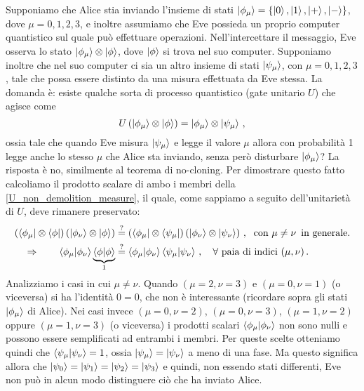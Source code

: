 \noindent Supponiamo che Alice stia inviando l'insieme di stati $\ket{\phi_\mu} = \{ \ket{0}, \ket{1}, \ket{+}, \ket{-} \}$, dove $\mu = 0, 1,2,3$, e inoltre assumiamo che Eve possieda un proprio computer quantistico sul quale può effettuare operazioni. Nell'intercettare il messaggio, Eve osserva lo stato $\ket{\phi_\mu} \otimes \ket{\phi}$, dove $\ket{\phi}$ si trova nel suo computer. Supponiamo inoltre che nel suo computer ci sia un altro insieme di stati $\ket{\psi_\mu}$, con $\mu = 0,1,2,3$, tale che possa essere distinto da una misura effettuata da Eve stessa. La domanda è: esiste qualche sorta di processo quantistico (gate unitario $U$) che agisce come
\begin{equation}\label{U_non_demolition_measure}
    U \left( \ket{\phi_\mu} \otimes \ket{\phi} \right) = \ket{\phi_\mu} \otimes \ket{\psi_\mu} \, ,
\end{equation}
ossia tale che quando Eve misura $\ket{\psi_\mu}$ e legge il valore $\mu$ allora con probabilità 1 legge anche lo stesso $\mu$ che Alice sta inviando, senza però disturbare $\ket{\phi_\mu}$? La risposta è no, similmente al teorema di no-cloning. Per dimostrare questo fatto calcoliamo il prodotto scalare di ambo i membri della \eqref{U_non_demolition_measure}, il quale, come sappiamo a seguito dell'unitarietà di $U$, deve rimanere preservato:
\begin{align*}
    \left( \bra{\phi_\mu} \otimes \bra{\phi} \right) \left( \ket{\phi_\nu} \otimes \ket{\phi} \right) &\overset{?}{=} \left( \bra{\phi_\mu} \otimes \bra{\psi_\mu} \right) \left( \ket{\phi_\nu} \otimes \ket{\psi_\nu} \right) \, , \; \text{ con } \mu \neq \nu \, \text{ in generale.} \\
    \Rightarrow \qquad \braket{\phi_\mu}{\phi_\nu} \underbrace{\braket{\phi}}_1 &\overset{?}{=} \braket{\phi_\mu}{\phi_\nu} \braket{\psi_\mu}{\psi_\nu} \, , \quad \forall \text{ paia di indici } (\mu,\nu) \, .
\end{align*}
Analizziamo i casi in cui $\mu \neq \nu$. Quando $(\mu = 2, \nu = 3)$ e $(\mu = 0, \nu = 1)$ (o viceversa) si ha l'identità $0 = 0$, che non è interessante (ricordare sopra gli stati $\ket{\phi_\mu}$ di Alice). Nei casi invece $(\mu = 0, \nu = 2)$, $(\mu = 0, \nu = 3)$, $(\mu = 1, \nu = 2)$ oppure $(\mu = 1, \nu = 3)$ (o viceversa) i prodotti scalari $\braket{\phi_\mu}{\phi_\nu}$ non sono nulli e possono essere semplificati ad entrambi i membri. Per queste scelte otteniamo quindi che $\braket{\psi_\mu}{\psi_\nu} = 1$, ossia $\ket{\psi_\mu} = \ket{\psi_\nu}$ a meno di una fase. Ma questo significa allora che $\ket{\psi_0} = \ket{\psi_1} = \ket{\psi_2} = \ket{\psi_3}$ e quindi, non essendo stati differenti, Eve non può in alcun modo distinguere ciò che ha inviato Alice. 

